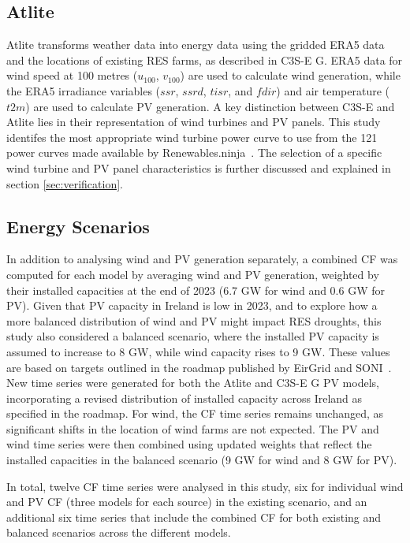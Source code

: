 \documentclass[a4paper, 11pt]{article}
\begin{document}
\subsection{Atlite} 
\label{sec:atlite}

Atlite transforms weather data into energy data using the gridded ERA5 data and the locations of existing RES farms, as described in C3S-E G. ERA5 data for wind speed at 100 metres ($u_{100}$, $v_{100}$) are used to calculate wind generation, while the ERA5 irradiance variables ($ssr$, $ssrd$, $tisr$, and $fdir$) and air temperature ($t2m$) are used to calculate PV generation. A key distinction between C3S-E and Atlite lies in their representation of wind turbines and PV panels. This study identifes the most appropriate wind turbine power curve to use from the 121 power curves made available by Renewables.ninja~\cite{staffell2016wake}. The selection of a specific wind turbine and PV panel characteristics is further discussed and explained in section \ref{sec:verification}.

\subsection{Energy Scenarios}
\label{sec:scenarios}

In addition to analysing wind and PV generation separately, a combined CF was computed for each model by averaging wind and PV generation, weighted by their installed capacities at the end of 2023 (6.7 GW for wind and 0.6 GW for PV). Given that PV capacity in Ireland is low in 2023, and to explore how a more balanced distribution of wind and PV might impact RES droughts, this study also considered a balanced scenario, where the installed PV capacity is assumed to increase to 8 GW, while wind capacity rises to 9 GW. These values are based on targets outlined in the roadmap published by EirGrid and SONI~\cite{eirgrid2023future}. New time series were generated for both the Atlite and C3S-E G PV models, incorporating a revised distribution of installed capacity across Ireland as specified in the roadmap. For wind, the CF time series remains unchanged, as significant shifts in the location of wind farms are not expected. The PV and wind time series were then combined using updated weights that reflect the installed capacities in the balanced scenario (9 GW for wind and 8 GW for PV).

In total, twelve CF time series were analysed in this study, six for individual wind and PV CF (three models for each source) in the existing scenario, and an additional six time series that include the combined CF for both existing and balanced scenarios across the different models.
\end{document}
